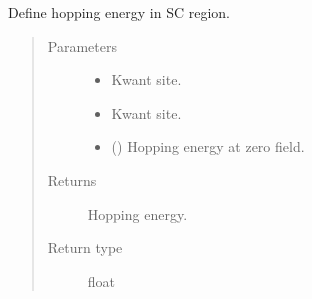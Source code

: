 \documentclass[letterpaper,10pt,english]{sphinxmanual}
\begin{document}

\begin{fulllineitems}
\label{\detokenize{modules:modules.functions.hopping_sc}}
\pysigstartsignatures
{}
\pysigstopsignatures
\sphinxAtStartPar
Define hopping energy in SC region.
\begin{quote}\begin{description}
\item[{Parameters}] \leavevmode\begin{itemize}
\item {} 
\sphinxAtStartPar
{} \textendash{} Kwant site.

\item {} 
\sphinxAtStartPar
{} \textendash{} Kwant site.

\item {} 
\sphinxAtStartPar
{} () \textendash{} Hopping energy at zero field.

\end{itemize}

\item[{Returns}] \leavevmode
\sphinxAtStartPar
Hopping energy.

\item[{Return type}] \leavevmode
\sphinxAtStartPar
float

\end{description}\end{quote}

\end{fulllineitems}

\end{document}
